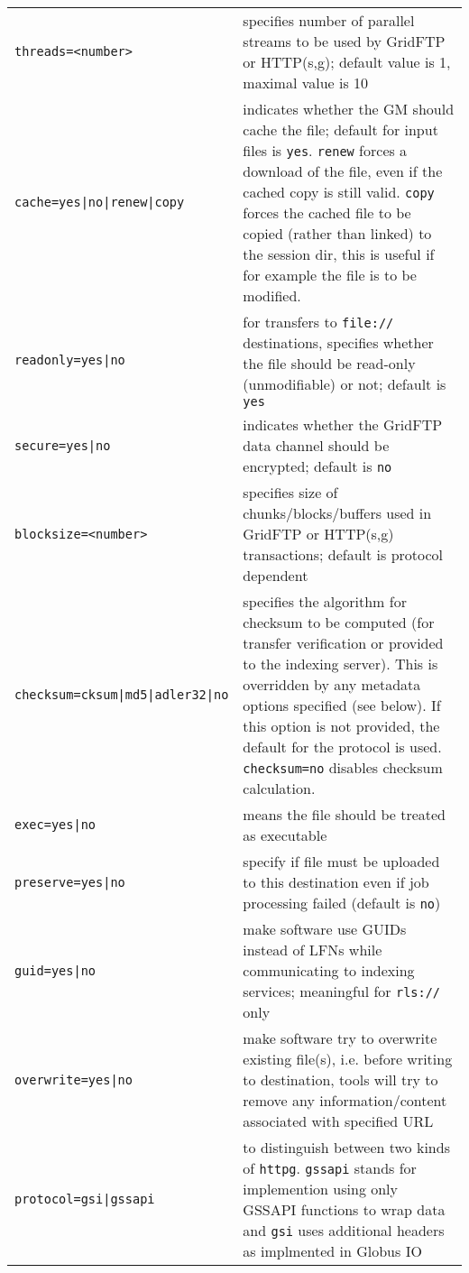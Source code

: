 \begin{longtable}{lp{10cm}}
   \verb#threads=<number># & specifies number of parallel
   streams to be used by GridFTP or HTTP(s,g); default value is 1,
   maximal value is 10\\
   \verb#cache=yes|no|renew|copy# & indicates whether the GM should
   cache the file; default for input files is \verb#yes#. \verb#renew#
   forces a download of the file, even if the cached copy is still valid.
   \verb#copy# forces the cached file to be copied (rather than linked) to
   the session dir, this is useful if for example the file is to be modified.\\
   \verb#readonly=yes|no# & for transfers to \verb#file://# destinations,
   specifies whether the file should be
   read-only (unmodifiable) or not; default is \verb#yes# \\
   \verb#secure=yes|no# & indicates whether the GridFTP data
   channel should be encrypted; default is \verb#no#\\
   \verb#blocksize=<number># & specifies size of
   chunks/blocks/buffers used in GridFTP or HTTP(s,g) transactions;
   default is protocol dependent\\
   \verb#checksum=cksum|md5|adler32|no# & specifies the algorithm for checksum to be
   computed (for transfer verification or provided to the indexing server). This is overridden
   by any metadata options specified (see below). If this option is
   not provided, the default for the protocol is used. \verb#checksum=no#
   disables checksum calculation.\\
   \verb#exec=yes|no# & means the file should be treated as executable\\
   \verb#preserve=yes|no# & specify if file must be uploaded to this
   destination even if job processing failed (default is \verb#no#)\\
   \verb#guid=yes|no# & make software use GUIDs instead of LFNs while
   communicating to indexing services; meaningful for \verb#rls://#
   only\\
   \verb#overwrite=yes|no# & make software try to overwrite existing
   file(s), i.e. before writing to destination, tools will try to remove
   any information/content associated with specified URL\\
   \verb#protocol=gsi|gssapi# & to distinguish between two kinds of 
   \verb#httpg#. \verb#gssapi# stands for implemention using only GSSAPI 
   functions to wrap data and \verb#gsi# uses additional headers as 
   implmented in Globus IO\\

\end{longtable}
